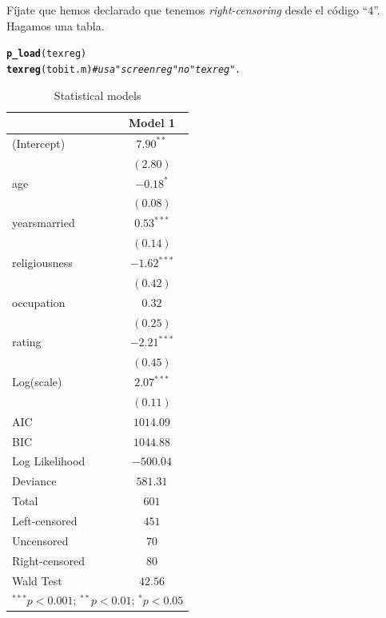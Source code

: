 \documentclass[onesided]{article}\usepackage[]{graphicx}\usepackage[]{color}
\makeatletter
\newcommand{\hlcom}[1]{\textcolor[rgb]{0.678,0.584,0.686}{\textit{#1}}}%
\newcommand{\hlstd}[1]{\textcolor[rgb]{0.345,0.345,0.345}{#1}}%
\newcommand{\hlkwd}[1]{\textcolor[rgb]{0.737,0.353,0.396}{\textbf{#1}}}%
\newenvironment{kframe}{%
 \def\at@end@of@kframe{}%
 \ifinner\ifhmode%
  \def\at@end@of@kframe{\end{minipage}}%
  \begin{minipage}{\columnwidth}%
 \fi\fi%
 \def\FrameCommand##1{\hskip\@totalleftmargin \hskip-\fboxsep
 \colorbox{shadecolor}{##1}\hskip-\fboxsep
     \hskip-\linewidth \hskip-\@totalleftmargin \hskip\columnwidth}%
 \MakeFramed {\advance\hsize-\width
   \@totalleftmargin\z@ \linewidth\hsize
   \@setminipage}}%
 {\par\unskip\endMakeFramed%
 \at@end@of@kframe}
\makeatother
\begin{document}
F\'ijate que hemos declarado que tenemos \emph{right-censoring} desde el c\'odigo ``4''. Hagamos una tabla.

\begin{kframe}
\begin{alltt}
\hlkwd{p_load}\hlstd{(texreg)}
\hlkwd{texreg}\hlstd{(tobit.m)} \hlcom{# usa "screenreg" no "texreg".}
\end{alltt}
\end{kframe}
\begin{table}
\begin{center}
\begin{tabular}{l c}
\hline
 & Model 1 \\
\hline
(Intercept)    & $7.90^{**}$   \\
               & $(2.80)$      \\
age            & $-0.18^{*}$   \\
               & $(0.08)$      \\
yearsmarried   & $0.53^{***}$  \\
               & $(0.14)$      \\
religiousness  & $-1.62^{***}$ \\
               & $(0.42)$      \\
occupation     & $0.32$        \\
               & $(0.25)$      \\
rating         & $-2.21^{***}$ \\
               & $(0.45)$      \\
Log(scale)     & $2.07^{***}$  \\
               & $(0.11)$      \\
\hline
AIC            & $1014.09$     \\
BIC            & $1044.88$     \\
Log Likelihood & $-500.04$     \\
Deviance       & $581.31$      \\
Total          & $601$         \\
Left-censored  & $451$         \\
Uncensored     & $70$          \\
Right-censored & $80$          \\
Wald Test      & $42.56$       \\
\hline
\multicolumn{2}{l}{\scriptsize{$^{***}p<0.001$; $^{**}p<0.01$; $^{*}p<0.05$}}
\end{tabular}
\caption{Statistical models}
\label{table:coefficients}
\end{center}
\end{table}
\end{document}
